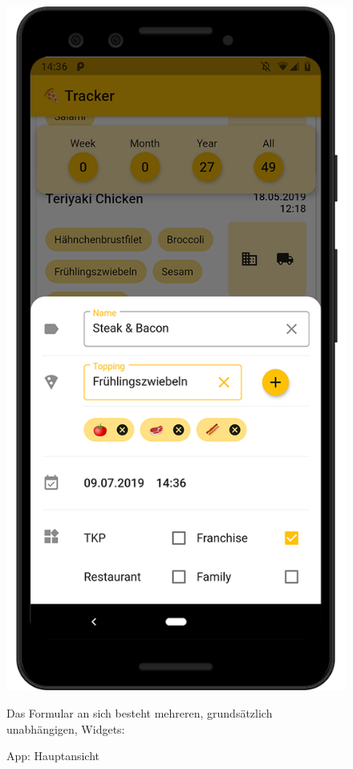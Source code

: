 \begin{figure}[H]
    \vspace{0pt}
        \includegraphics[width=\linewidth]{pixel-3_mockup-2--form}
        \caption{
            App: Hauptansicht
        }
    \endminipage\hfill
    \vspace{0pt}
        Das Formular an sich besteht mehreren, grundsätzlich
        unabhängigen, Widgets:


\end{figure}
